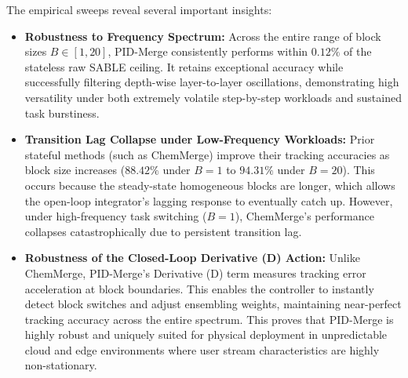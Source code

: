 The empirical sweeps reveal several important insights:
\begin{itemize}
    \item \textbf{Robustness to Frequency Spectrum:} Across the entire range of block sizes $B \in [1, 20]$, PID-Merge consistently performs within $0.12\%$ of the stateless raw SABLE ceiling. It retains exceptional accuracy while successfully filtering depth-wise layer-to-layer oscillations, demonstrating high versatility under both extremely volatile step-by-step workloads and sustained task burstiness.
    \item \textbf{Transition Lag Collapse under Low-Frequency Workloads:} Prior stateful methods (such as ChemMerge) improve their tracking accuracies as block size increases ($88.42\%$ under $B=1$ to $94.31\%$ under $B=20$). This occurs because the steady-state homogeneous blocks are longer, which allows the open-loop integrator's lagging response to eventually catch up. However, under high-frequency task switching ($B=1$), ChemMerge's performance collapses catastrophically due to persistent transition lag.
    \item \textbf{Robustness of the Closed-Loop Derivative (D) Action:} Unlike ChemMerge, PID-Merge's Derivative (D) term measures tracking error acceleration at block boundaries. This enables the controller to instantly detect block switches and adjust ensembling weights, maintaining near-perfect tracking accuracy across the entire spectrum. This proves that PID-Merge is highly robust and uniquely suited for physical deployment in unpredictable cloud and edge environments where user stream characteristics are highly non-stationary.
\end{itemize}
